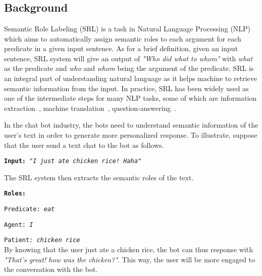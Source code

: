 \chapter{\babSatu}


\section{Background}
	
	Semantic Role Labeling (SRL) is a task in Natural Language Processing (NLP) which aims to automatically assign semantic roles to each argument for each predicate in a given input sentence. As for a brief definition, given an input sentence, SRL system will give an output of \textit{"Who did what to whom"} with \textit{what} as the predicate and \textit{who} and \textit{whom} being the argument of the predicate. SRL is an integral part of understanding natural language as it helps machine to retrieve semantic information from the input. In practice, SRL has been widely used as one of the intermediate steps for many NLP tasks, some of which are information extraction~\cite{emanuele2013textual, surdeanu2003using}, machine translation~\cite{liu2010semantic, lo2013improving}, question-answering~\cite{shen2007using, moschitti2003open}.
	
	In the chat bot industry, the bots need to understand semantic information of the user's text in order to generate more personalized response. To illustrate, suppose that the user send a text chat to the bot as follows.
	
	\texttt{\textbf{Input:} \textit{"I just ate chicken rice! Haha"}}
	
	The SRL system then extracts the semantic roles of the text.
	
	\texttt{\textbf{Roles:}}
	
	\texttt{Predicate: \textit{eat}}
	
	\texttt{Agent: \textit{I}}
	
	\texttt{Patient: \textit{chicken rice}}
	\\
	
	By knowing that the user just ate a chicken rice, the bot can thus response with \textit{"That's great! how was the chicken?"}. This way, the user will be more engaged to the conversation with the bot.
	
